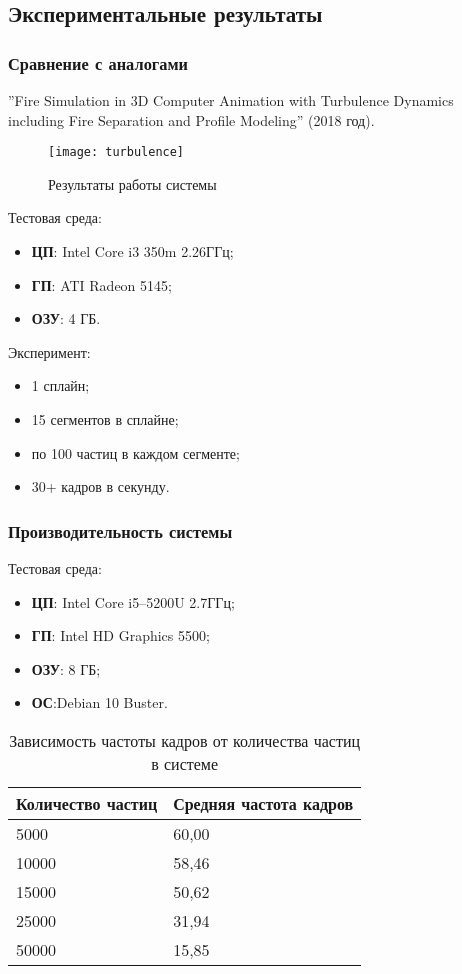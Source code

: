 \subsection{Экспериментальные результаты}
\begin{frame}[allowframebreaks]
\frametitle{Сравнение с аналогами}
''Fire Simulation
in 3D Computer Animation with Turbulence Dynamics including Fire Separation and
Profile Modeling'' (2018 год).
\begin{figure}[htb]
	\centering
    \texttt{[image: turbulence]}
    \caption{Результаты работы системы}%
    \label{fig:turbulence}
\end{figure}

Тестовая среда:
\begin{itemize}
    \item \textbf{ЦП}: Intel Core i3 350m 2.26ГГц;
    \item \textbf{ГП}: ATI Radeon 5145;
    \item \textbf{ОЗУ}: 4 ГБ.
\end{itemize}

Эксперимент:
\begin{itemize}
    \item 1 сплайн;
    \item 15 сегментов в сплайне;
    \item по 100 частиц в каждом сегменте;
    \item 30+ кадров в секунду.
\end{itemize}
\end{frame}

\begin{frame}
\frametitle{Производительность системы}
Тестовая среда:
\begin{itemize}
    \item \textbf{ЦП}: Intel Core i5--5200U 2.7ГГц;
    \item \textbf{ГП}: Intel HD Graphics 5500;
    \item \textbf{ОЗУ}: 8 ГБ;
    \item \textbf{ОС}:Debian 10 Buster.
\end{itemize}

\begin{table}[htb]
\caption{Зависимость частоты кадров от количества частиц в системе}%
\label{table:amountBench}
\centering
\small
\begin{tabular}{| l | l |}
    \hline
    Количество частиц & Средняя частота кадров \\
    \hline
    5000 &  60,00 \\
    \hline
    10000 & 58,46 \\
    \hline
    15000 & 50,62 \\
    \hline
    25000 & 31,94 \\
    \hline
    50000 & 15,85 \\
    \hline
\end{tabular}
\end{table}
\end{frame}

